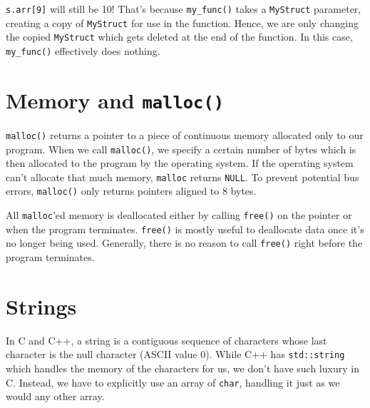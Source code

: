 \documentclass[12pt]{report}
\begin{document}
\texttt{s.arr[9]} will still be 10! That's because \texttt{my\_func()} takes a \texttt{MyStruct} parameter, creating a copy of \texttt{MyStruct} for use in the function. Hence, we are only changing the copied \texttt{MyStruct} which gets deleted at the end of the function.
In this case, \texttt{my\_func()} effectively does nothing.

\section{Memory and \texttt{malloc()}}
\texttt{malloc()} returns a pointer to a piece of continuous memory allocated only to our program. When we call \texttt{malloc()}, we specify a certain number of bytes which is then allocated to the program by the operating system. If the operating system can't allocate that much memory, \texttt{malloc} returns \texttt{NULL}. To prevent potential bus errors, \texttt{malloc()} only returns pointers aligned to $8$ bytes.

All \texttt{malloc}'ed memory is deallocated either by calling \texttt{free()} on the pointer or when the program terminates. \texttt{free()} is mostly useful to deallocate data once it's no longer being used. Generally, there is no reason to call \texttt{free()} right before the program terminates.


\section{Strings}
In C and C++, a string is a contiguous sequence of characters whose last character is the null character (ASCII value 0). While C++ has \texttt{std::string} which handles the memory of the characters for us, we don't have such luxury in C. Instead, we have to explicitly use an array of \texttt{char}, handling it just as we would any other array.

\amzindex
\end{document}

